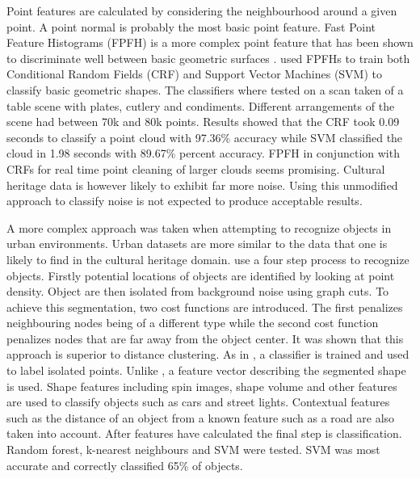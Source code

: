 \documentclass[10pt,twocolumn]{article}
\begin{document}
Point features are calculated by considering the neighbourhood around a given point. A point normal is probably the most basic point feature. Fast Point Feature Histograms (FPFH) is a more complex point feature that has been shown to discriminate well between basic geometric surfaces \cite{Rusu2009}. \citeauthor{Rusu2009} used FPFHs to train both Conditional Random Fields (CRF) and Support Vector Machines (SVM) to classify basic geometric shapes. The classifiers where tested on a scan taken of a table scene with plates, cutlery and condiments. Different arrangements of the scene had between 70k and 80k points. Results showed that the CRF took 0.09 seconds to classify a point cloud with 97.36\% accuracy while SVM classified the cloud in 1.98 seconds with 89.67\% percent accuracy. FPFH in conjunction with CRFs for real time point cleaning of larger clouds seems promising. Cultural heritage data is however likely to exhibit far more noise. Using this unmodified approach to classify noise is not expected to produce acceptable results.

A more complex approach was taken when attempting to recognize objects in urban environments. Urban datasets are more similar to the data that one is likely to find in the cultural heritage domain. \citeauthor{Golovinskiy2009} use a four step process to recognize objects. Firstly potential locations of objects are identified by looking at point density. Object are then isolated from background noise using graph cuts. To achieve this segmentation, two cost functions are introduced. The first penalizes neighbouring nodes being of a different type while the second cost function penalizes nodes that are far away from the object center. It was shown that this approach is superior to distance clustering. As in \cite{Rusu2009}, a classifier is trained and used to label isolated points. Unlike \cite{Rusu2009}, a feature vector describing the segmented shape is used. Shape features including spin images, shape volume and other features are used to classify objects such as cars and street lights. Contextual features such as the distance of an object from a known feature such as a road are also taken into account. After features have calculated the final step is classification. Random forest, k-nearest neighbours and SVM were tested. SVM was most accurate and correctly classified 65\% of objects.

\end{document}
